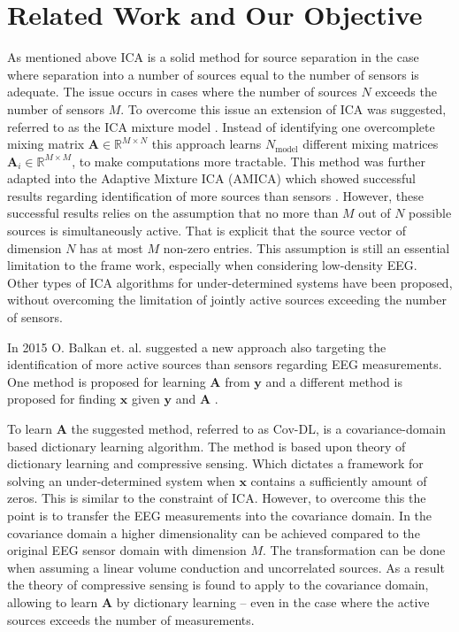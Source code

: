 \section{Related Work and Our Objective}\label{sec:relatedwork}
As mentioned above ICA is a solid method for source separation in the case where separation into a number of sources equal to the number of sensors is adequate. The issue occurs in cases where the number of sources $N$ exceeds the number of sensors $M$.  
To overcome this issue an extension of ICA was suggested, referred to as the ICA mixture model \cite{Balkan2015}.
Instead of identifying one overcomplete mixing matrix $\mathbf{A} \in \mathbb{R}^{M \times N}$ this approach learns $N_{\text{model}}$ different mixing matrices $\mathbf{A}_i \in \mathbb{R}^{M\times M}$, to make computations more tractable. 
This method was further adapted into the Adaptive Mixture ICA (AMICA) which showed successful results regarding identification of more sources than sensors \cite{Palmer2008}. 
However, these successful results relies on the assumption that no more than $M$ out of $N$ possible sources is simultaneously active. That is explicit that the source vector of dimension $N$ has at most $M$ non-zero entries.
This assumption is still an essential limitation to the frame work, especially when considering low-density EEG. 
Other types of ICA algorithms for under-determined systems have been proposed, without overcoming the limitation of jointly active sources exceeding the number of sensors.

In 2015 O. Balkan et. al. suggested a new approach also targeting the identification of more active sources than sensors regarding EEG measurements. One method is proposed for learning $\textbf{A}$ from $\textbf{y}$ \cite{Balkan2015} and a different method is proposed for finding $\textbf{x}$ given $\textbf{y}$ and $\textbf{A}$ \cite{Balkan2014}.

To learn $\textbf{A}$ the suggested method, referred to as Cov-DL, is a covariance-domain based dictionary learning algorithm. 
The method is based upon theory of dictionary learning and compressive sensing. Which dictates a framework for solving an under-determined system when $\textbf{x}$ contains a sufficiently amount of zeros. 
This is similar to the constraint of ICA.  However, to overcome this the point is to transfer the EEG measurements into the covariance domain. In the covariance domain a higher dimensionality can be achieved compared to the original EEG sensor domain with dimension $M$.
The transformation can be done when assuming a linear volume conduction and uncorrelated sources.
As a result the theory of compressive sensing is found to  apply to the covariance domain, allowing to learn $\textbf{A}$ by dictionary learning -- even in the case where the active sources exceeds the number of measurements.

